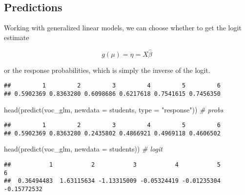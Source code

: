 \documentclass[
  oneside]{book}
\newenvironment{Shaded}{\begin{snugshade}}{\end{snugshade}}
\newcommand{\AttributeTok}[1]{\textcolor[rgb]{0.77,0.63,0.00}{#1}}
\newcommand{\CommentTok}[1]{\textcolor[rgb]{0.56,0.35,0.01}{\textit{#1}}}
\newcommand{\FunctionTok}[1]{\textcolor[rgb]{0.00,0.00,0.00}{#1}}
\newcommand{\NormalTok}[1]{#1}
\newcommand{\SpecialCharTok}[1]{\textcolor[rgb]{0.00,0.00,0.00}{#1}}
\newcommand{\StringTok}[1]{\textcolor[rgb]{0.31,0.60,0.02}{#1}}
\begin{document}
\hypertarget{predictions}{%
\subsection{Predictions}\label{predictions}}

Working with generalized linear models, we can choose whether to get the
logit estimate

\[
g(\mu) = \eta = X \hat\beta
\]

or the response probabilities, which is simply the inverse of the logit.

\begin{Shaded}
\end{Shaded}

\begin{verbatim}
##         1         2         3         4         5         6 
## 0.5902369 0.8363280 0.6098686 0.6217618 0.7541615 0.7456350
\end{verbatim}

\begin{Shaded}
\begin{Highlighting}[]
\FunctionTok{head}\NormalTok{(}\FunctionTok{predict}\NormalTok{(voc\_glm, }\AttributeTok{newdata =}\NormalTok{ students, }\AttributeTok{type =} \StringTok{"response"}\NormalTok{)) }\CommentTok{\# probs}
\end{Highlighting}
\end{Shaded}

\begin{verbatim}
##         1         2         3         4         5         6 
## 0.5902369 0.8363280 0.2435802 0.4866921 0.4969118 0.4606502
\end{verbatim}

\begin{Shaded}
\begin{Highlighting}[]
\FunctionTok{head}\NormalTok{(}\FunctionTok{predict}\NormalTok{(voc\_glm, }\AttributeTok{newdata =}\NormalTok{ students)) }\CommentTok{\# logit}
\end{Highlighting}
\end{Shaded}

\begin{verbatim}
##           1           2           3           4           5           6 
##  0.36494483  1.63115634 -1.13315009 -0.05324419 -0.01235304 -0.15772532
\end{verbatim}
\end{document}
